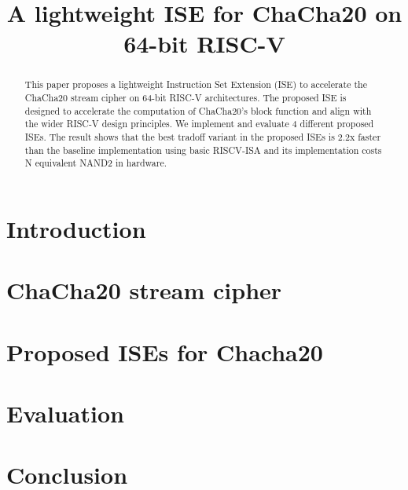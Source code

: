 \documentclass[preprint]{iacrtrans}
\title{A lightweight ISE for ChaCha20 on 64-bit RISC-V}
\author{}
\institute{}
\begin{document}

\maketitle

\begin{abstract}
This paper proposes a lightweight Instruction Set Extension (ISE) to accelerate the ChaCha20 stream cipher on 64-bit RISC-V architectures. The proposed ISE is designed to accelerate the computation of ChaCha20's block function and align with the wider RISC-V design principles. We implement and evaluate 4 different proposed ISEs. The result shows that the best tradoff variant in the proposed ISEs is 2.2x faster than the baseline implementation using basic RISCV-ISA and its implementation costs N equivalent NAND2 in hardware.
\end{abstract}



\section{Introduction}
\label{sec:intro}


\section{ChaCha20 stream cipher}
\label{sec:bg}


\section{Proposed ISEs for Chacha20}
\label{sec:ise}


\section{Evaluation}
\label{sec:res}


\section{Conclusion}
\label{sec:outro}






\end{document}
